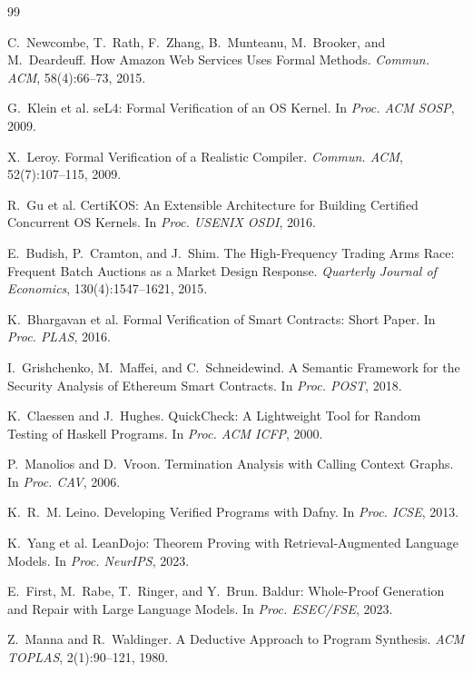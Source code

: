 \documentclass[11pt,a4paper]{article}
\begin{document}
\begin{thebibliography}{99}

C.~Newcombe, T.~Rath, F.~Zhang, B.~Munteanu, M.~Brooker, and M.~Deardeuff.
How Amazon Web Services Uses Formal Methods.
\emph{Commun. ACM}, 58(4):66--73, 2015.

G.~Klein et al.
seL4: Formal Verification of an OS Kernel.
In \emph{Proc. ACM SOSP}, 2009.

X.~Leroy.
Formal Verification of a Realistic Compiler.
\emph{Commun. ACM}, 52(7):107--115, 2009.

R.~Gu et al.
CertiKOS: An Extensible Architecture for Building Certified
Concurrent OS Kernels.
In \emph{Proc. USENIX OSDI}, 2016.

E.~Budish, P.~Cramton, and J.~Shim.
The High-Frequency Trading Arms Race: Frequent Batch Auctions as a
Market Design Response.
\emph{Quarterly Journal of Economics}, 130(4):1547--1621, 2015.

K.~Bhargavan et al.
Formal Verification of Smart Contracts: Short Paper.
In \emph{Proc. PLAS}, 2016.

I.~Grishchenko, M.~Maffei, and C.~Schneidewind.
A Semantic Framework for the Security Analysis of Ethereum Smart
Contracts.
In \emph{Proc. POST}, 2018.

K.~Claessen and J.~Hughes.
QuickCheck: A Lightweight Tool for Random Testing of Haskell Programs.
In \emph{Proc. ACM ICFP}, 2000.

P.~Manolios and D.~Vroon.
Termination Analysis with Calling Context Graphs.
In \emph{Proc. CAV}, 2006.

K.~R.~M. Leino.
Developing Verified Programs with Dafny.
In \emph{Proc. ICSE}, 2013.

K.~Yang et al.
LeanDojo: Theorem Proving with Retrieval-Augmented Language Models.
In \emph{Proc. NeurIPS}, 2023.

E.~First, M.~Rabe, T.~Ringer, and Y.~Brun.
Baldur: Whole-Proof Generation and Repair with Large Language Models.
In \emph{Proc. ESEC/FSE}, 2023.

Z.~Manna and R.~Waldinger.
A Deductive Approach to Program Synthesis.
\emph{ACM TOPLAS}, 2(1):90--121, 1980.


\end{thebibliography}
\end{document}
